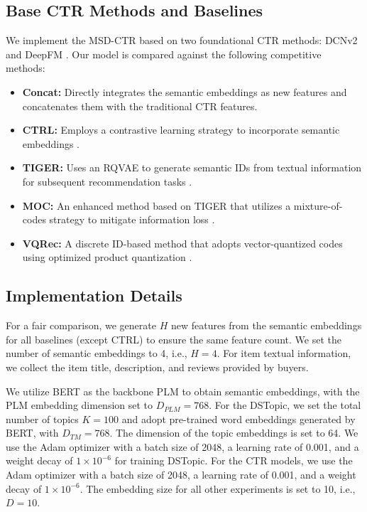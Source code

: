 \subsection{Base CTR Methods and Baselines}
We implement the MSD-CTR based on two foundational CTR methods: DCNv2 \cite{wang2021dcn} and DeepFM \cite{guo2017deepfm}. Our model is compared against the following competitive methods:
\begin{itemize}
    \item \textbf{Concat:} Directly integrates the semantic embeddings as new features and concatenates them with the traditional CTR features.
    \item \textbf{CTRL:} Employs a contrastive learning strategy to incorporate semantic embeddings \cite{li2023ctrl}.
    \item \textbf{TIGER:} Uses an RQVAE\cite{lee2022autoregressive} to generate semantic IDs from textual information for subsequent recommendation tasks \cite{rajput2023recommender}.
    \item \textbf{MOC:} An enhanced method based on TIGER that utilizes a mixture-of-codes strategy to mitigate information loss \cite{zhang2024towards}.
    \item \textbf{VQRec:} A discrete ID-based method that adopts vector-quantized codes using optimized product quantization \cite{hou2023learning,ge2013optimized}.
\end{itemize}

\subsection{Implementation Details}
For a fair comparison, we generate \( H \) new features from the semantic embeddings for all baselines (except CTRL) to ensure the same feature count. We set the number of semantic embeddings to 4, i.e., \( H = 4 \). For item textual information, we collect the item title, description, and reviews provided by buyers. 

We utilize BERT \cite{devlin2019bert} as the backbone PLM to obtain semantic embeddings, with the PLM embedding dimension set to \( D_{PLM} = 768 \). For the DSTopic, we set the total number of topics \( K = 100 \) and adopt pre-trained word embeddings generated by BERT, with \( D_{TM} = 768 \). The dimension of the topic embeddings is set to 64. We use the Adam optimizer with a batch size of 2048, a learning rate of 0.001, and a weight decay of \( 1 \times 10^{-6} \) for training DSTopic. For the CTR models, we use the Adam optimizer with a batch size of 2048, a learning rate of 0.001, and a weight decay of \( 1 \times 10^{-6} \). The embedding size for all other experiments is set to 10, i.e., \( D = 10 \). 

